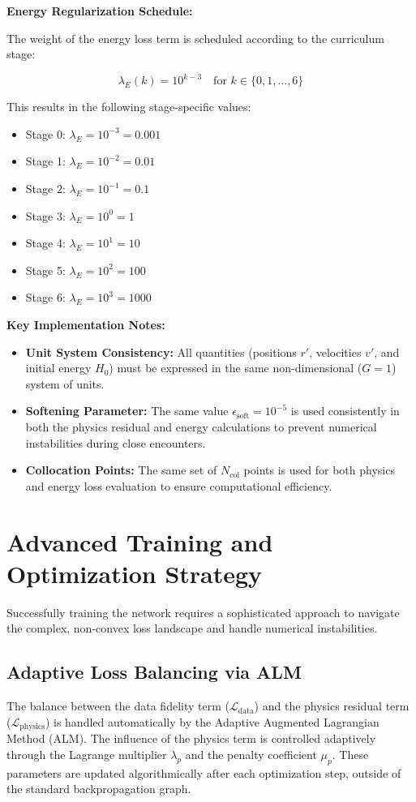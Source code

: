 \documentclass{article}
\begin{document}
\textbf{Energy Regularization Schedule:}

The weight of the energy loss term is scheduled according to the curriculum stage:

\[
\lambda_E(k) = 10^{k-3} \quad \text{for } k \in \{0, 1, \ldots, 6\}
\]

This results in the following stage-specific values:
\begin{itemize}
    \item Stage 0: $\lambda_E = 10^{-3} = 0.001$
    \item Stage 1: $\lambda_E = 10^{-2} = 0.01$
    \item Stage 2: $\lambda_E = 10^{-1} = 0.1$
    \item Stage 3: $\lambda_E = 10^{0} = 1$
    \item Stage 4: $\lambda_E = 10^{1} = 10$
    \item Stage 5: $\lambda_E = 10^{2} = 100$
    \item Stage 6: $\lambda_E = 10^{3} = 1000$
\end{itemize}

\textbf{Key Implementation Notes:}
\begin{itemize}
    \item \textbf{Unit System Consistency:} All quantities (positions $r'$, velocities $v'$, and initial energy $H_0$) must be expressed in the same non-dimensional ($G = 1$) system of units.
    \item \textbf{Softening Parameter:} The same value $\epsilon_{\text{soft}} = 10^{-5}$ is used consistently in both the physics residual and energy calculations to prevent numerical instabilities during close encounters.
    \item \textbf{Collocation Points:} The same set of $N_{\text{col}}$ points is used for both physics and energy loss evaluation to ensure computational efficiency.
\end{itemize}

\section{Advanced Training and Optimization Strategy}

Successfully training the network requires a sophisticated approach to navigate the complex, non-convex loss landscape and handle numerical instabilities.

\subsection{Adaptive Loss Balancing via ALM}
The balance between the data fidelity term ($\mathcal{L}_{\text{data}}$) and the physics residual term ($\mathcal{L}_{\text{physics}}$) is handled automatically by the Adaptive Augmented Lagrangian Method (ALM). The influence of the physics term is controlled adaptively through the Lagrange multiplier $\lambda_p$ and the penalty coefficient $\mu_p$. These parameters are updated algorithmically after each optimization step, outside of the standard backpropagation graph.
\end{document}
